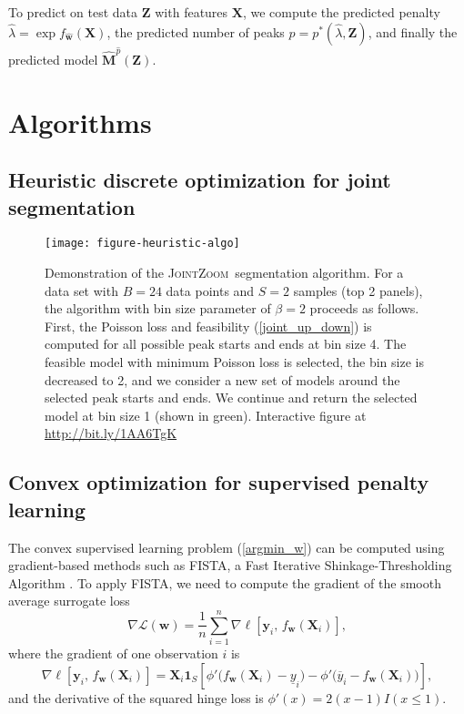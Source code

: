 \documentclass{article} %
\newcommand{\JointHeuristic}{\textsc{JointZoom}}
\begin{document}
To predict on test data $\mathbf Z$ with features $\mathbf
X$, we compute the predicted penalty $\hat \lambda = \exp
f_{\mathbf{\hat w}}(\mathbf X)$, the predicted number of
peaks $\hat p = p^*(\hat \lambda, \mathbf Z)$, and finally the
predicted model $\mathbf{\hat M}^{\hat p}(\mathbf Z)$.

\section{Algorithms}

\subsection{Heuristic discrete optimization for joint segmentation}

\begin{figure}[b!]
  \centering
  \texttt{[image: figure-heuristic-algo]}
  \vskip -0.5cm
  \caption{Demonstration of the \JointHeuristic\ segmentation
    algorithm. For a data set with $B=24$ data points and $S=2$
    samples (top 2 panels), the algorithm with bin size parameter of
    $\beta=2$ proceeds as follows. First, the Poisson loss and
    feasibility (\ref{joint_up_down}) is computed for all possible
    peak starts and ends at bin size 4. The feasible model with
    minimum Poisson loss is selected, the bin size is decreased to 2,
    and we consider a new set of models around the selected peak
    starts and ends. We continue and return the selected model at bin
    size 1 (shown in green). Interactive figure at
    \url{http://bit.ly/1AA6TgK}}
  \label{fig:heuristic-algo}
\end{figure}

\subsection{Convex optimization for supervised penalty learning}

The convex supervised learning problem (\ref{argmin_w}) can be
computed using gradient-based methods such as FISTA, a Fast Iterative
Shinkage-Thresholding Algorithm \citep{fista}. To apply FISTA, we need
to compute the gradient of the smooth average surrogate loss
\begin{equation}
  \label{eq:average_gradient}
  \nabla \mathcal L(\mathbf w) = 
  \frac 1 n
  \sum_{i=1}^n 
  \nabla \ell \left[
    \mathbf y_i,\,
    f_{\mathbf w}(  \mathbf X_i )
  \right],
\end{equation}
where the gradient of one observation $i$ is
\begin{equation}
  \label{eq:one_gradient}
  \nabla \ell \left[
    \mathbf y_i,\,
    f_{\mathbf w}( \mathbf X_i )
  \right]
  =
  \mathbf X_i \mathbf 1_S
  \left[
    \phi'\big(
    f_{\mathbf w}( \mathbf X_i ) - \underline y_i
    \big)
    -
    \phi'\big(
    \overline y_i - f_{\mathbf w}( \mathbf X_i )
    \big)
  \right],
\end{equation}
and the derivative of the squared hinge loss is $\phi'(x)=2(x-1)I(x\leq 1)$.
\end{document}
